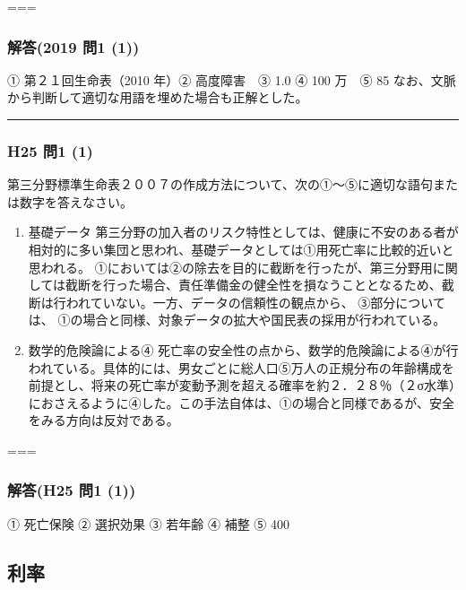 \documentclass[]{article}
\begin{document}
===

\hypertarget{ux89e3ux7b542019-ux554f1-1}{%
\subsubsection{解答(2019 問1 (1))}\label{ux89e3ux7b542019-ux554f1-1}}

① 第２１回生命表（2010 年）② 高度障害　③ 1.0 ④ 100 万　⑤ 85
なお、文脈から判断して適切な用語を埋めた場合も正解とした。

\begin{center}\rule{0.5\linewidth}{0.5pt}\end{center}

\hypertarget{h25-ux554f1-1}{%
\subsubsection{H25 問1 (1)}\label{h25-ux554f1-1}}

第三分野標準生命表２００７の作成方法について、次の①～⑤に適切な語句または数字を答えなさい。

\begin{enumerate}
\def\labelenumi{\arabic{enumi}.}
\tightlist
\item
  基礎データ
  第三分野の加入者のリスク特性としては、健康に不安のある者が相対的に多い集団と思われ、基礎データとしては①用死亡率に比較的近いと思われる。
  ①においては②の除去を目的に截断を行ったが、第三分野用に関しては截断を行った場合、責任準備金の健全性を損なうこととなるため、截断は行われていない。一方、データの信頼性の観点から、
  ③部分については、
  ①の場合と同様、対象データの拡大や国民表の採用が行われている。
\item
  数学的危険論による④
  死亡率の安全性の点から、数学的危険論による④が行われている。具体的には、男女ごとに総人口⑤万人の正規分布の年齢構成を前提とし、将来の死亡率が変動予測を超える確率を約２．２８％（２σ水準）におさえるように④した。この手法自体は、①の場合と同様であるが、安全をみる方向は反対である。
\end{enumerate}

===

\hypertarget{ux89e3ux7b54h25-ux554f1-1}{%
\subsubsection{解答(H25 問1 (1))}\label{ux89e3ux7b54h25-ux554f1-1}}

① 死亡保険 ② 選択効果 ③ 若年齢 ④ 補整 ⑤ 400

\hypertarget{ux5229ux7387}{%
\subsection{利率}\label{ux5229ux7387}}
\end{document}
